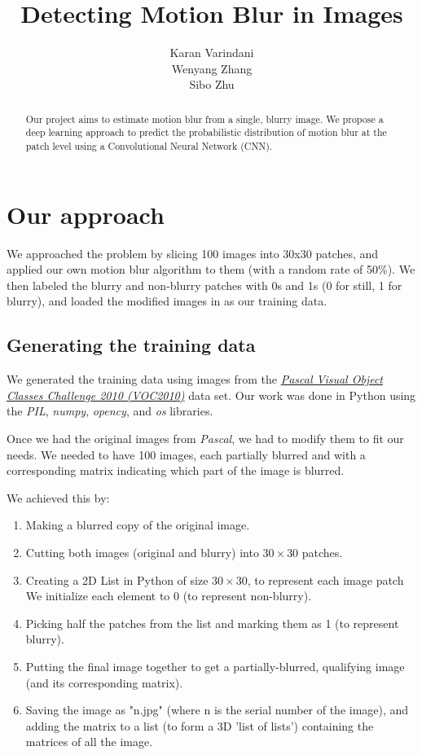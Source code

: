 \documentclass{article}
\title{Detecting Motion Blur in Images}
\author{
  Karan Varindani \\
  \And
  Wenyang Zhang \\
  \And
  Sibo Zhu \\
}
\begin{document}
\maketitle

\begin{abstract}
  Our project aims to estimate motion blur from a single, blurry image. 
  We propose a deep learning approach to predict the probabilistic distribution 
  of motion blur at the patch level using a Convolutional Neural Network (CNN).
\end{abstract}

\section{Our approach}
We approached the problem by slicing 100 images into 30x30 patches, and applied
our own motion blur algorithm to them (with a random rate of 50\%). We then labeled 
the blurry and non-blurry patches with 0s and 1s (0 for still, 1 for blurry), and
loaded the modified images in as our training data.
  
\subsection{Generating the training data}
We generated the training data using images from the 
\textit{\href{http://host.robots.ox.ac.uk/pascal/VOC/voc2010/}{Pascal Visual Object 
Classes Challenge 2010 (VOC2010)}} data set. Our work was done in Python using the 
\textit{PIL}, \textit{numpy}, \textit{opency}, and \textit{os} libraries.

Once we had the original images from \textit{Pascal}, we had to modify them to fit our 
needs. We needed to have 100 images, each partially blurred and with a corresponding 
matrix indicating which part of the image is blurred. 

We achieved this by:
\begin{enumerate}
  \item Making a blurred copy of the original image. 
  \item Cutting both images (original and blurry) into $30\times30$ patches.
  \item Creating a 2D List in Python of size $30\times30$, to represent each image patch
  We initialize each element to 0 (to represent non-blurry). 
  \item Picking half the patches from the list and marking them as 1 (to represent 
  blurry).
  \item Putting the final image together to get a partially-blurred, qualifying image 
  (and its corresponding matrix).
  \item Saving the image as "n.jpg" (where n is the serial number of the image), and 
  adding the matrix to a list (to form a 3D 'list of lists') containing the matrices 
  of all the image.
\end{enumerate}
\end{document}
